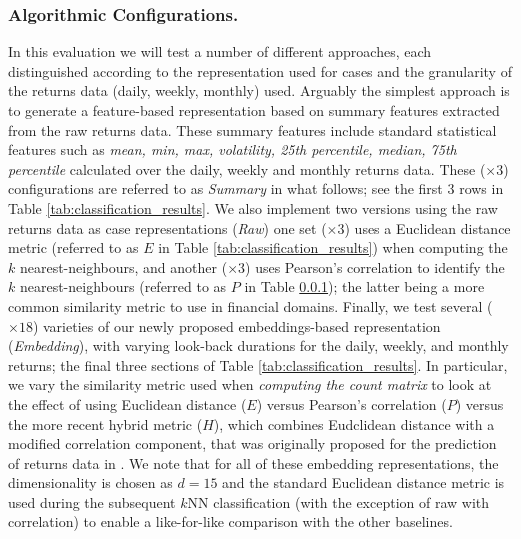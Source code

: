 \documentclass[runningheads]{llncs}
\begin{document}
\subsubsection{Algorithmic Configurations.} In this evaluation we will test a number of different approaches, each distinguished according to the representation used for cases and the granularity of the returns data (daily, weekly, monthly) used. Arguably the simplest approach is to generate a feature-based representation based on summary features extracted from the raw returns data. These summary features include standard statistical features such as \emph{mean, min, max, volatility, 25th percentile, median, 75th percentile} calculated over the daily, weekly and monthly returns data. These ($\times3$) configurations are referred to as \emph{Summary} in what follows; see the first 3 rows in Table \ref{tab:classification_results}. We also implement two versions using the raw returns data as case representations (\emph{Raw}) one set ($\times3$) uses a Euclidean distance metric (referred to as $E$ in Table \ref{tab:classification_results}) when computing the $k$ nearest-neighbours, and another ($\times3$) uses Pearson's correlation to identify the $k$ nearest-neighbours (referred to as $P$ in Table \ref{}); the latter being a more common similarity metric to use in financial domains. Finally, we test several ($\times18$) varieties of our newly proposed embeddings-based representation (\emph{Embedding}), with varying look-back durations for the daily, weekly, and monthly returns; the final three sections of Table \ref{tab:classification_results}. In particular, we vary the similarity metric used when \emph{computing the count matrix} to look at the effect of using Euclidean distance ($E$) versus Pearson's correlation ($P$) versus the more recent hybrid metric ($H$), which combines Eudclidean distance with a modified correlation component, that was originally proposed for the prediction of returns data in \cite{dolphin2021measuring}. We note that for all of these embedding representations, the dimensionality is chosen as $d=15$ and the standard Euclidean distance metric is used during the subsequent $k$NN classification (with the exception of raw with correlation) to enable a like-for-like comparison with the other baselines.
\end{document}
